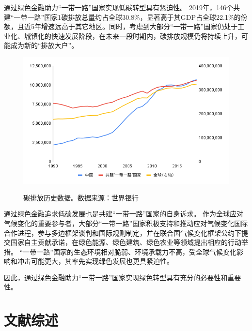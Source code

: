 通过绿色金融助力“一带一路”国家实现低碳转型具有紧迫性。
2019年，146个共建“一带一路”国家1碳排放总量约占全球30.8\%，显著高于其GDP占全球22.1\%的份额，且近5年增速远高于其它地区。同时，考虑到大部分“一带一路”国家仍处于工业化、城镇化的快速发展阶段，在未来一段时期内，碳排放规模仍将持续上升，可能成为新的“排放大户”。
\begin{figure}[H]
    \centering
    \includegraphics[width=0.8\linewidth]{./img/碳排放-折线图.png}
    \label{fig:carbonemit2}
    \caption{碳排放历史数据。数据来源：世界银行}
\end{figure}

通过绿色金融追求低碳发展也是共建“一带一路”国家的自身诉求。
作为全球应对气候变化的重要参与者，大部分“一带一路”国家积极支持和推动应对气候变化国际合作进程，参与多边框架谈判和国际规则制定，并在联合国气候变化框架公约下提交国家自主贡献承诺，在绿色能源、绿色建筑、绿色农业等领域提出相应的行动举措。
“一带一路”国家的生态环境相对脆弱、环境承载力不高，受全球气候变化影响和冲击可能更大，其率先实现绿色发展也更具紧迫性。

因此，通过绿色金融助力“一带一路”国家实现绿色转型具有充分的必要性和重要性。

\section*{文献综述}
